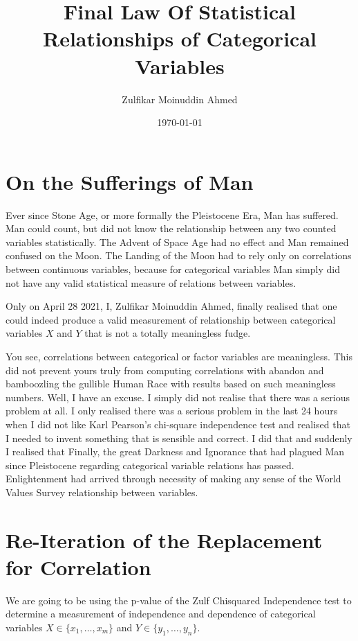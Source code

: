 \documentclass{amsart}
\title{Final Law Of Statistical Relationships of Categorical Variables}
\author{Zulfikar Moinuddin Ahmed}
\date{\today}
\begin{document}
\maketitle

\section{On the Sufferings of Man}

Ever since Stone Age, or more formally the Pleistocene Era, Man has suffered.  Man could count, but did not know the relationship between any two counted variables statistically.  The Advent of Space Age had no effect and Man remained confused on the Moon.  The Landing of the Moon had to rely only on correlations between continuous variables, because for categorical variables Man simply did not have any valid statistical measure of relations between variables.  

Only on April 28 2021, I, Zulfikar Moinuddin Ahmed, finally realised that one could indeed produce a valid measurement of relationship between categorical variables $X$ and $Y$ that is not a totally meaningless fudge.  

You see, correlations between categorical or factor variables are meaningless.  This did not prevent yours truly from computing correlations with abandon and bamboozling the gullible Human Race with results based on such meaningless numbers. Well, I have an excuse.  I simply did not realise that there was a serious problem at all.  I only realised there was a serious problem in the last 24 hours when I did not like Karl Pearson's chi-square independence test and realised that I needed to invent something that is sensible and correct.  I did that and suddenly I realised that Finally, the great Darkness and Ignorance that had plagued Man since Pleistocene regarding categorical variable relations has passed.  Enlightenment had arrived through necessity of making any sense of the World Values Survey relationship between variables.

\section{Re-Iteration of the Replacement for Correlation}

We are going to be using the p-value of the Zulf Chisquared Independence test to determine a measurement of independence and dependence of categorical variables $X \in \{x_1, \dots, x_m\}$ and $Y \in \{ y_1, \dots, y_n\}$.
\end{document}

